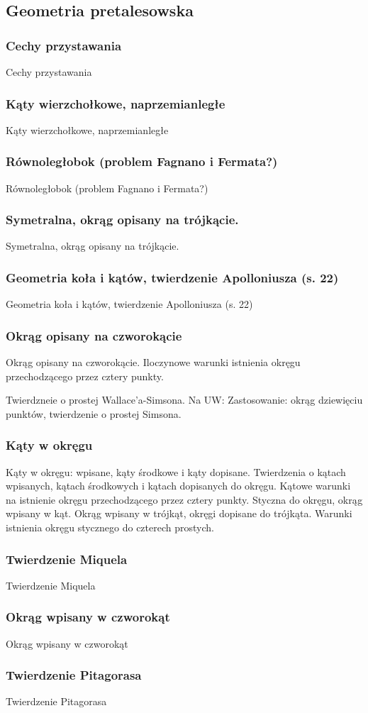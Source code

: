 \subsection{Geometria pretalesowska}
\subsubsection{Cechy przystawania}
Cechy przystawania

\subsubsection{Kąty wierzchołkowe, naprzemianległe}
Kąty wierzchołkowe, naprzemianległe



\subsubsection{Równoległobok (problem Fagnano i Fermata?)}
Równoległobok (problem Fagnano i Fermata?)

\subsubsection{Symetralna, okrąg opisany na trójkącie.}
Symetralna, okrąg opisany na trójkącie.

\subsubsection{Geometria koła i kątów, twierdzenie Apolloniusza (s. 22)}
Geometria koła i kątów, twierdzenie Apolloniusza (s. 22)

\subsubsection{Okrąg opisany na czworokącie}
Okrąg opisany na czworokącie.
Iloczynowe warunki istnienia okręgu przechodzącego przez cztery punkty.

Twierdzneie o prostej Wallace'a-Simsona.
Na UW: Zastosowanie: okrąg dziewięciu punktów, twierdzenie o prostej Simsona.

\subsubsection{Kąty w okręgu}
Kąty w okręgu: wpisane, kąty środkowe i kąty dopisane.
Twierdzenia o kątach wpisanych, kątach środkowych i kątach dopisanych do okręgu.
Kątowe warunki na istnienie okręgu przechodzącego przez cztery punkty.
Styczna do okręgu, okrąg wpisany w kąt.
Okrąg wpisany w trójkąt, okręgi dopisane do trójkąta.
Warunki istnienia okręgu stycznego do czterech prostych.

\subsubsection{Twierdzenie Miquela}
Twierdzenie Miquela

\subsubsection{Okrąg wpisany w czworokąt}
Okrąg wpisany w czworokąt

\subsubsection{Twierdzenie Pitagorasa}
Twierdzenie Pitagorasa